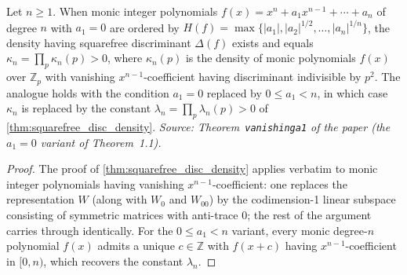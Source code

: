 \begin{theorem}
  \label{thm:vanishing_trace_density}
  Let \(n\geq 1\).  When monic integer polynomials
  \(f(x)=x^n+a_1x^{n-1}+\cdots+a_n\) of degree \(n\) with \(a_1=0\)
  are ordered by
  \(H(f)=\max\{|a_1|,|a_2|^{1/2},\ldots,|a_n|^{1/n}\}\), the density
  having squarefree discriminant \(\Delta(f)\) exists and equals
  \(\kappa_n=\prod_p\kappa_n(p)>0\), where \(\kappa_n(p)\) is the
  density of monic polynomials \(f(x)\) over \(\mathbb{Z}_p\) with
  vanishing \(x^{n-1}\)-coefficient having discriminant indivisible by
  \(p^2\).  The analogue holds with the condition \(a_1=0\) replaced by
  \(0\leq a_1<n\), in which case \(\kappa_n\) is replaced by the
  constant \(\lambda_n=\prod_p\lambda_n(p)>0\) of
  \cref{thm:squarefree_disc_density}.
  \textit{Source: Theorem~\texttt{vanishinga1} of the paper
  (the \(a_1=0\) variant of Theorem~1.1).}
\end{theorem}
\begin{proof}
  The proof of \cref{thm:squarefree_disc_density} applies verbatim to
  monic integer polynomials having vanishing \(x^{n-1}\)-coefficient:
  one replaces the representation \(W\) (along with \(W_0\) and
  \(W_{00}\)) by the codimension-1 linear subspace consisting of
  symmetric matrices with anti-trace \(0\); the rest of the argument
  carries through identically.  For the \(0\leq a_1<n\) variant, every
  monic degree-\(n\) polynomial \(f(x)\) admits a unique \(c\in\mathbb{Z}\)
  with \(f(x+c)\) having \(x^{n-1}\)-coefficient in \([0,n)\), which
  recovers the constant \(\lambda_n\).
\end{proof}


